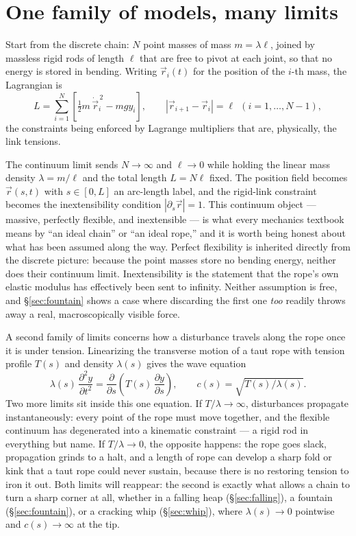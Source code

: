 \documentclass[11pt]{book}
\begin{document}
\section{One family of models, many limits}
\label{sec:family}

Start from the discrete chain: $N$ point masses of mass $m = \lambda \ell$, joined by massless rigid rods of length $\ell$ that are free to pivot at each joint, so that no energy is stored in bending. Writing $\vec r_i(t)$ for the position of the $i$-th mass, the Lagrangian is
\[
L = \sum_{i=1}^{N}\left[\tfrac12 m\, \dot{\vec r}_i^{\,2} - m g y_i\right], \qquad |\vec r_{i+1}-\vec r_i| = \ell \ \ (i=1,\dots,N-1),
\]
the constraints being enforced by Lagrange multipliers that are, physically, the link tensions.

The continuum limit sends $N\to\infty$ and $\ell\to 0$ while holding the linear mass density $\lambda = m/\ell$ and the total length $L = N\ell$ fixed. The position field becomes $\vec r(s,t)$ with $s\in[0,L]$ an arc-length label, and the rigid-link constraint becomes the inextensibility condition $|\partial_s \vec r| = 1$. This continuum object --- massive, perfectly flexible, and inextensible --- is what every mechanics textbook means by ``an ideal chain'' or ``an ideal rope,'' and it is worth being honest about what has been assumed along the way. Perfect flexibility is inherited directly from the discrete picture: because the point masses store no bending energy, neither does their continuum limit. Inextensibility is the statement that the rope's own elastic modulus has effectively been sent to infinity. Neither assumption is free, and \S\ref{sec:fountain} shows a case where discarding the first one \emph{too} readily throws away a real, macroscopically visible force.

A second family of limits concerns how a disturbance travels along the rope once it is under tension. Linearizing the transverse motion of a taut rope with tension profile $T(s)$ and density $\lambda(s)$ gives the wave equation
\begin{equation}
\lambda(s)\,\frac{\partial^2 y}{\partial t^2} = \frac{\partial}{\partial s}\!\left(T(s)\,\frac{\partial y}{\partial s}\right), \qquad c(s) = \sqrt{T(s)/\lambda(s)}.
\label{eq:wave}
\end{equation}
Two more limits sit inside this one equation. If $T/\lambda \to \infty$, disturbances propagate instantaneously: every point of the rope must move together, and the flexible continuum has degenerated into a kinematic constraint --- a rigid rod in everything but name. If $T/\lambda \to 0$, the opposite happens: the rope goes slack, propagation grinds to a halt, and a length of rope can develop a sharp fold or kink that a taut rope could never sustain, because there is no restoring tension to iron it out. Both limits will reappear: the second is exactly what allows a chain to turn a sharp corner at all, whether in a falling heap (\S\ref{sec:falling}), a fountain (\S\ref{sec:fountain}), or a cracking whip (\S\ref{sec:whip}), where $\lambda(s)\to 0$ pointwise and $c(s)\to\infty$ at the tip.
\end{document}
